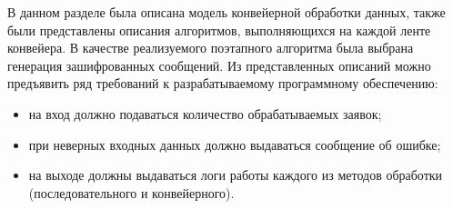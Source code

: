 В данном разделе была описана модель конвейерной обработки данных, также были
представлены описания алгоритмов, выполняющихся на каждой ленте конвейера. В
качестве реализуемого поэтапного алгоритма была выбрана генерация зашифрованных
сообщений.  Из представленных описаний можно предъявить ряд требований к
разрабатываемому программному обеспечению:
\begin{itemize}[left=\parindent]
    \item на вход должно подаваться количество обрабатываемых заявок;
    \item при неверных входных данных должно выдаваться сообщение об ошибке;
    \item на выходе должны выдаваться логи работы каждого из методов обработки
        (последовательного и конвейерного).
\end{itemize}
